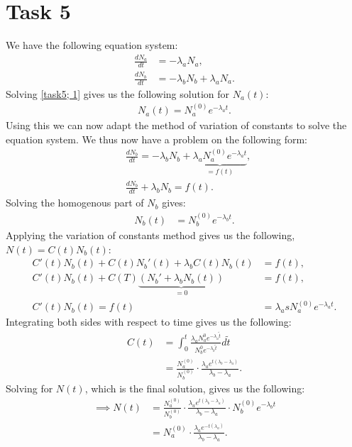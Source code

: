 \documentclass[]{article}
\begin{document}
\section*{Task 5}
We have the following equation system:
\begin{align}
    \frac{d N_a}{dt} &= -\lambda_{a}N_a,\label{task5; 1}\\
    \frac{d N_b}{dt} &= -\lambda_{b}N_b + \lambda_{a}N_a\label{task5; 2}.
\end{align}
Solving \eqref{task5; 1} gives us the following solution for $N_a(t)$:
\begin{align*}
    N_a(t) = N_a^{(0)}e^{-\lambda_a t}.
\end{align*}
Using this we can now adapt the method of variation of constants to solve the equation system.
We thus now have a problem on the following form:
\begin{align*}
    &\frac{d N_b}{dt} = -\lambda_b N_b + \underbrace{\lambda_a N_a^{(0)}e^{-\lambda_a t}}_{=f(t)},\\
    &\frac{d N_b}{dt} + \lambda_b N_b = f(t).
\end{align*} Solving the homogenous part of $N_b$ gives:
\begin{align*}
    N_b(t) &= N_b^{(0)}e^{-\lambda_b t}.
\end{align*} Applying the variation of constants method gives us the following, $N(t) = C(t)N_b(t)$:
\begin{align*}
    C'(t)N_b(t) + C(t)N_b'(t) + \lambda_b C(t)N_b(t) &= f(t),\\
    C'(t)N_b(t) + C(T)\underbrace{(N_b' + \lambda_bN_b(t))}_{=0} &= f(t),\\
    C'(t)N_b(t) = f(t) &= \lambda_a sN_a^{(0)}e^{-\lambda_at}.
\end{align*}Integrating both sides with respect to time gives us the following:
\begin{align*}
    C(t) &= \int_0^t\frac{\lambda_aN_a^{0}e^{-\lambda_a\tilde{t}}}{N_b^{0}e^{-\lambda_b\tilde{t}}}d\tilde{t}\\
    &= \frac{N_a^{(0)}}{N_b^{(0)}}\cdot\frac{\lambda_ae^{t(\lambda_b - \lambda_a)}}{\lambda_b - \lambda_a}.
\end{align*}Solving for $N(t)$, which is the final solution, gives us the following:
\begin{align*}
    \implies N(t) &= \frac{N_a^{(0)}}{N_b^{(0)}}\cdot\frac{\lambda_ae^{t(\lambda_b - \lambda_a)}}{\lambda_b - \lambda_a} \cdot N_b^{(0)}e^{-\lambda_b t}\\
    &= N_a^{(0)}\cdot \frac{\lambda_ae^{-t(\lambda_a)}}{\lambda_b - \lambda_a}.
\end{align*}
\end{document}
